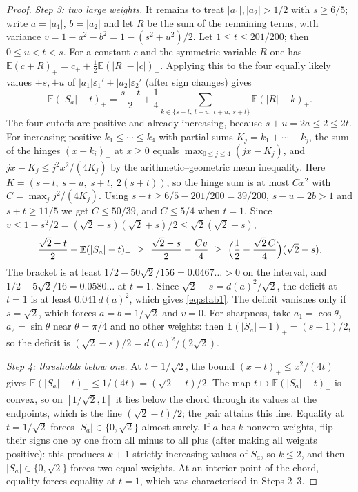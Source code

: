 \documentclass[11pt,a4paper]{article}
\numberwithin{equation}{section}
\theoremstyle{remark}
\newcommand{\E}{\mathbb E}
\begin{document}
\begin{proof}
\emph{Step 3: two large weights.} It remains to treat $|a_1|,|a_2|>1/2$ with
$s\ge6/5$; write $a=|a_1|$, $b=|a_2|$ and let $R$ be the sum of the
remaining terms, with variance $v=1-a^2-b^2=1-(s^2+u^2)/2$. Let
$1\le t\le201/200$; then $0\le u<t<s$. For a constant $c$ and the symmetric
variable $R$ one has $\E(c+R)_+=c_++\tfrac12\E(|R|-|c|)_+$. Applying this to
the four equally likely values $\pm s,\pm u$ of $|a_1|\varepsilon_1'+|a_2|\varepsilon_2'$ (after sign changes) gives
\begin{equation}\label{eq:four-hinges}
 \E(|S_a|-t)_+=\frac{s-t}{2}+
 \frac14\sum_{k\in\{s-t,\ t-u,\ t+u,\ s+t\}}\E(|R|-k)_+ .
\end{equation}
The four cutoffs are positive and already increasing, because
$s+u=2a\le2\le2t$. For increasing positive $k_1\le\cdots\le k_4$ with
partial sums $K_j=k_1+\cdots+k_j$, the sum of the hinges $(x-k_i)_+$ at
$x\ge0$ equals $\max_{0\le j\le4}(jx-K_j)$, and $jx-K_j\le j^2x^2/(4K_j)$ by
the arithmetic--geometric mean inequality. Here
$K=(s-t,\ s-u,\ s+t,\ 2(s+t))$, so the hinge sum is at most $Cx^2$ with
$C=\max_jj^2/(4K_j)$. Using $s-t\ge6/5-201/200=39/200$, $s-u=2b>1$ and
$s+t\ge11/5$ we get $C\le50/39$, and $C\le5/4$ when $t=1$. Since
$v\le1-s^2/2=(\sqrt2-s)(\sqrt2+s)/2\le\sqrt2(\sqrt2-s)$,
\[
 \frac{\sqrt2-t}{2}-\E(|S_a|-t)_+\ \ge\ \frac{\sqrt2-s}{2}-\frac{Cv}{4}
 \ \ge\ \Bigl(\frac12-\frac{\sqrt2\,C}{4}\Bigr)(\sqrt2-s).
\]
The bracket is at least $1/2-50\sqrt2/156=0.0467\ldots>0$ on the interval,
and $1/2-5\sqrt2/16=0.0580\ldots$ at $t=1$. Since
$\sqrt2-s=d(a)^2/\sqrt2$, the deficit at $t=1$ is at least
$0.041\,d(a)^2$, which gives \eqref{eq:stab1}. The deficit vanishes only if
$s=\sqrt2$, which forces $a=b=1/\sqrt2$ and $v=0$.
For sharpness, take $a_1=\cos\theta$, $a_2=\sin\theta$ near
$\theta=\pi/4$ and no other weights: then
$\E(|S_a|-1)_+=(s-1)/2$, so the deficit is
$(\sqrt2-s)/2=d(a)^2/(2\sqrt2)$.

\emph{Step 4: thresholds below one.} At $t=1/\sqrt2$, the bound
$(x-t)_+\le x^2/(4t)$ gives $\E(|S_a|-t)_+\le1/(4t)=(\sqrt2-t)/2$. The map
$t\mapsto\E(|S_a|-t)_+$ is convex, so on $[1/\sqrt2,1]$ it lies below the
chord through its values at the endpoints, which is the line
$(\sqrt2-t)/2$; the pair attains this line. Equality at $t=1/\sqrt2$ forces
$|S_a|\in\{0,\sqrt2\}$ almost surely. If $a$ has $k$ nonzero weights, flip
their signs one by one from all minus to all plus (after making all weights
positive): this produces $k+1$ strictly increasing values of $S_a$, so
$k\le2$, and then $|S_a|\in\{0,\sqrt2\}$ forces two equal weights. At an
interior point of the chord, equality forces equality at $t=1$, which was
characterised in Steps 2--3.
\end{proof}
\end{document}
